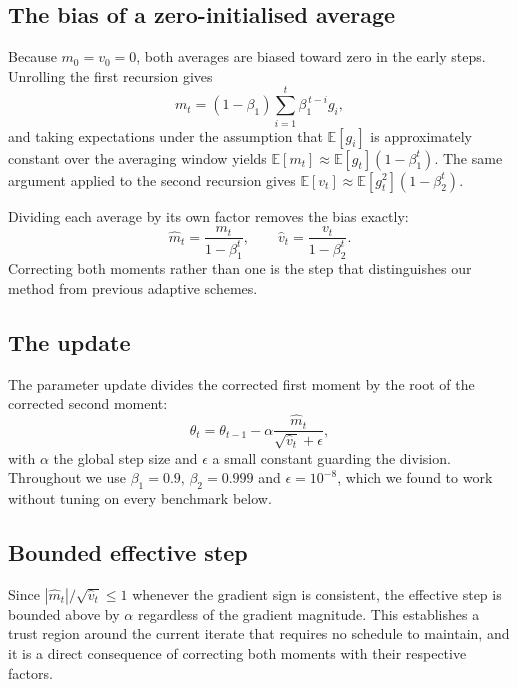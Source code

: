 \documentclass{article}
\begin{document}
\subsection{The bias of a zero-initialised average}

Because $m_0 = v_0 = 0$, both averages are biased toward zero in the early
steps. Unrolling the first recursion gives
\begin{equation}
  m_t = (1 - \beta_1) \sum_{i=1}^{t} \beta_1^{\,t-i} g_i,
\end{equation}
and taking expectations under the assumption that $\mathbb{E}[g_i]$ is
approximately constant over the averaging window yields
$\mathbb{E}[m_t] \approx \mathbb{E}[g_t](1 - \beta_1^t)$. The same argument
applied to the second recursion gives
$\mathbb{E}[v_t] \approx \mathbb{E}[g_t^2](1 - \beta_2^t)$.

Dividing each average by its own factor removes the bias exactly:
\begin{equation}
  \hat{m}_t = \frac{m_t}{1 - \beta_1^t}, \qquad
  \hat{v}_t = \frac{v_t}{1 - \beta_2^t}.
\end{equation}
Correcting both moments rather than one is the step that distinguishes our
method from previous adaptive schemes.

\subsection{The update}

The parameter update divides the corrected first moment by the root of the
corrected second moment:
\begin{equation}
  \theta_t = \theta_{t-1} - \alpha \frac{\hat{m}_t}{\sqrt{\hat{v}_t} +
  \epsilon},
\end{equation}
with $\alpha$ the global step size and $\epsilon$ a small constant guarding
the division. Throughout we use $\beta_1 = 0.9$, $\beta_2 = 0.999$ and
$\epsilon = 10^{-8}$, which we found to work without tuning on every benchmark
below.

\subsection{Bounded effective step}

Since $|\hat{m}_t| / \sqrt{\hat{v}_t} \le 1$ whenever the gradient sign is
consistent, the effective step is bounded above by $\alpha$ regardless of the
gradient magnitude. This establishes a trust region around the current
iterate that requires no schedule to maintain, and it is a direct consequence
of correcting both moments with their respective factors.
\end{document}
